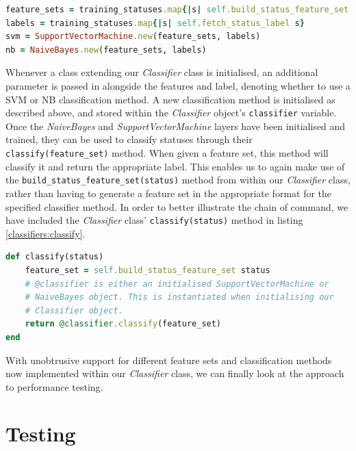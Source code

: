 \begin{lstlisting}[language=Ruby, caption={Example initialisation of LIBSVM and AI4R Naive Bayes classifiers through intermediary layer}, label=classifiers:build_classifiers]
feature_sets = training_statuses.map{|s| self.build_status_feature_set s}
labels = training_statuses.map{|s| self.fetch_status_label s}
svm = SupportVectorMachine.new(feature_sets, labels)
nb = NaiveBayes.new(feature_sets, labels)
\end{lstlisting}

Whenever a class extending our \emph{Classifier} class is initialised, an additional parameter is passed in alongside the features and label, denoting whether to use a SVM or NB classification method. A new classification method is initialised as described above, and stored within the \emph{Classifier} object's \texttt{classifier} variable. Once the \emph{NaiveBayes} and \emph{SupportVectorMachine} layers have been initialised and trained, they can be used to classify statuses through their \texttt{classify(feature\_set)} method. When given a feature set, this method will classify it and return the appropriate label. This enables us to again make use of the \texttt{build\-\_status\-\_feature\-\_set\-(status)} method from within our \emph{Classifier} class, rather than having to generate a feature set in the appropriate format for the specified classifier method. In order to better illustrate the chain of command, we have included the \emph{Classifier} class' \texttt{classify(status)} method in listing \ref{classifiers:classify}.

\begin{lstlisting}[language=Ruby, caption={\emph{Classifier} class' classify method}, label=classifiers:classify]
def classify(status)
	feature_set = self.build_status_feature_set status
	# @classifier is either an initialised SupportVectorMachine or
	# NaiveBayes object. This is instantiated when initialising our
	# Classifier object.
	return @classifier.classify(feature_set) 
end
\end{lstlisting}

With unobtrusive support for different feature sets and classification methods now implemented within our \emph{Classifier} class, we can finally look at the approach to performance testing.

\section{Testing}

